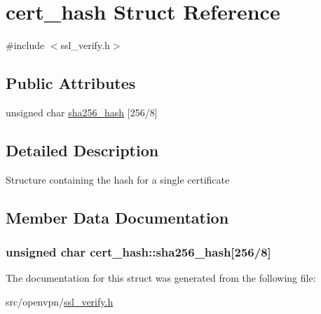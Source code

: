 \hypertarget{structcert__hash}{}\section{cert\+\_\+hash Struct Reference}
\label{structcert__hash}


{\ttfamily \#include $<$ssl\+\_\+verify.\+h$>$}

\subsection*{Public Attributes}
\begin{DoxyCompactItemize}
\item 
unsigned char \hyperlink{structcert__hash_ab480ce52fd263405a9674ddc59b7b1fc}{sha256\+\_\+hash} \mbox{[}256/8\mbox{]}
\end{DoxyCompactItemize}


\subsection{Detailed Description}
Structure containing the hash for a single certificate 

\subsection{Member Data Documentation}
\hypertarget{structcert__hash_ab480ce52fd263405a9674ddc59b7b1fc}{}
\subsubsection[{sha256\+\_\+hash}]{\setlength{\rightskip}{0pt plus 5cm}unsigned char cert\+\_\+hash\+::sha256\+\_\+hash\mbox{[}256/8\mbox{]}}\label{structcert__hash_ab480ce52fd263405a9674ddc59b7b1fc}


The documentation for this struct was generated from the following file\+:\begin{DoxyCompactItemize}
\item 
src/openvpn/\hyperlink{ssl__verify_8h}{ssl\+\_\+verify.\+h}\end{DoxyCompactItemize}
